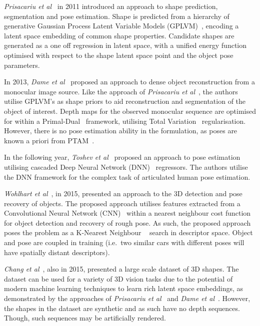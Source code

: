 \textit{Prisacariu et al}~\cite{Prisacariu2011} in 2011 introduced an approach to shape prediction, 
segmentation and pose estimation. Shape is predicted from a hierarchy of generative Gaussian Process 
Latent Variable Models (GPLVM)~\cite{Lawrence2005}, encoding a latent space embedding of common shape 
properties. Candidate shapes are generated as a one off regression in latent space, with a unified 
energy function optimised with respect to the shape latent space point and the object pose parameters.

In 2013, \textit{Dame et al}~\cite{Dame2013} proposed an approach to dense object reconstruction from a 
monocular image source. Like the approach of \textit{Prisacariu et al}~\cite{Prisacariu2011}, the authors 
utilise GPLVM's as shape priors to aid reconstruction and segmentation of the object of interest. Depth maps 
for the observed monocular sequence are optimised for within a Primal-Dual~\cite{Boyd2004Convex} framework, utilising 
Total Variation~\cite{Rudin1992} regularisation. However, there is no pose estimation 
ability in the formulation, as poses are known a priori from PTAM~\cite{Klein2007}.

In the following year, \textit{Toshev et al}~\cite{Toshev2014} proposed an approach to pose estimation 
utilising cascaded Deep Neural Network (DNN)~\cite{LeCun2015} regressors. The authors utilise the DNN 
framework for the complex task of articulated human pose estimation. %

\textit{Wohlhart et al}~\cite{Wohlhart2015}, in 2015, presented an approach to the 3D detection and pose 
recovery of objects. The proposed approach utilises features extracted from a Convolutional Neural 
Network (CNN)~\cite{LeCun2015} within a nearest neighbour cost function for object detection and recovery 
of rough pose. As such, the proposed approach poses the problem as a K-Nearest Neighbour
~\cite{Altman1992} search in descriptor space. Object and pose are coupled in training (i.e.\ two similar 
cars with different poses will have spatially distant descriptors).

\textit{Chang et al}~\cite{Chang2015}, also in 2015, presented a large scale dataset of 3D shapes. The 
dataset can be used for a variety of 3D vision tasks due to the potential of modern machine learning 
techniques to learn rich latent space embeddings, as demonstrated by the approaches of 
\textit{Prisacariu et al}~\cite{Prisacariu2011} and \textit{Dame et al}~\cite{Dame2013}. However, the 
shapes in the dataset are synthetic and as such have no depth sequences. Though, such sequences may be 
artificially rendered.

